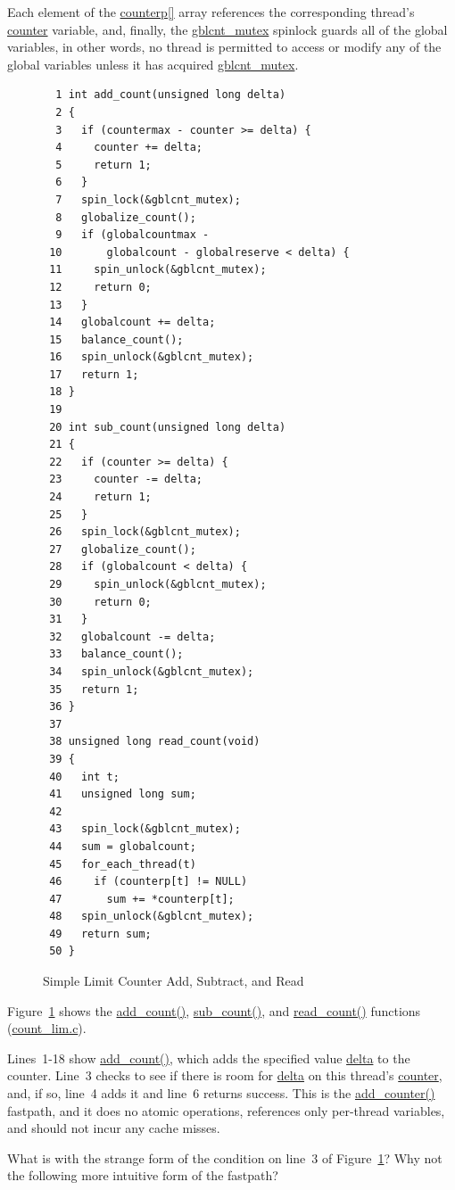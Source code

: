 Each element of the \url{counterp[]} array references the corresponding
thread's \url{counter} variable, and, finally, the \url{gblcnt_mutex}
spinlock guards all of the global variables, in other words, no thread
is permitted to access or modify any of the global variables unless it
has acquired \url{gblcnt_mutex}.

\begin{figure}[tbp]
{ \scriptsize
\begin{verbatim}
  1 int add_count(unsigned long delta)
  2 {
  3   if (countermax - counter >= delta) {
  4     counter += delta;
  5     return 1;
  6   }
  7   spin_lock(&gblcnt_mutex);
  8   globalize_count();
  9   if (globalcountmax -
 10       globalcount - globalreserve < delta) {
 11     spin_unlock(&gblcnt_mutex);
 12     return 0;
 13   }
 14   globalcount += delta;
 15   balance_count();
 16   spin_unlock(&gblcnt_mutex);
 17   return 1;
 18 }
 19 
 20 int sub_count(unsigned long delta)
 21 {
 22   if (counter >= delta) {
 23     counter -= delta;
 24     return 1;
 25   }
 26   spin_lock(&gblcnt_mutex);
 27   globalize_count();
 28   if (globalcount < delta) {
 29     spin_unlock(&gblcnt_mutex);
 30     return 0;
 31   }
 32   globalcount -= delta;
 33   balance_count();
 34   spin_unlock(&gblcnt_mutex);
 35   return 1;
 36 }
 37 
 38 unsigned long read_count(void)
 39 {
 40   int t;
 41   unsigned long sum;
 42 
 43   spin_lock(&gblcnt_mutex);
 44   sum = globalcount;
 45   for_each_thread(t)
 46     if (counterp[t] != NULL)
 47       sum += *counterp[t];
 48   spin_unlock(&gblcnt_mutex);
 49   return sum;
 50 }
\end{verbatim}
}
\caption{Simple Limit Counter Add, Subtract, and Read}
\label{fig:count:Simple Limit Counter Add, Subtract, and Read}
\end{figure}

Figure~\ref{fig:count:Simple Limit Counter Add, Subtract, and Read}
shows the \url{add_count()}, \url{sub_count()}, and \url{read_count()}
functions (\url{count_lim.c}).

Lines~1-18 show \url{add_count()}, which adds the specified value \url{delta}
to the counter.
Line~3 checks to see if there is room for \url{delta} on this thread's
\url{counter}, and, if so, line~4 adds it and line~6 returns success.
This is the \url{add_counter()} fastpath, and it does no atomic operations,
references only per-thread variables, and should not incur any cache misses.

\QuickQuiz{}
	What is with the strange form of the condition on line~3 of
	Figure~\ref{fig:count:Simple Limit Counter Add, Subtract, and Read}?
	Why not the following more intuitive form of the fastpath?

